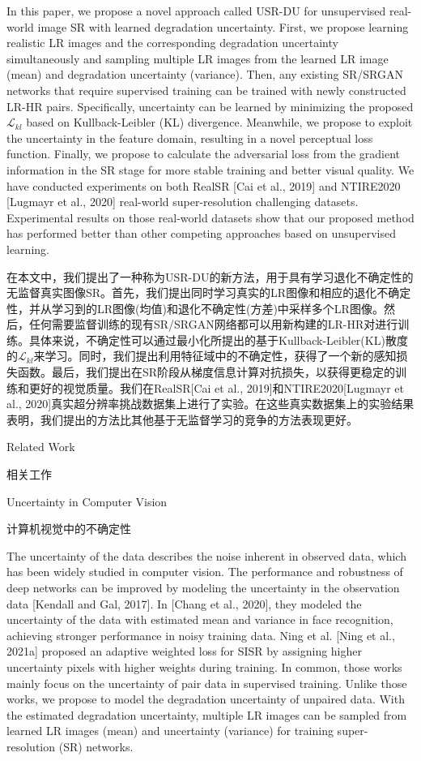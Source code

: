 In this paper, we propose a novel approach called USR-DU for unsupervised real-world image SR with learned degradation uncertainty. First, we propose learning realistic LR images and the corresponding degradation uncertainty simultaneously and sampling multiple LR images from the learned LR image (mean) and degradation uncertainty (variance). Then, any existing SR/SRGAN networks that require supervised training can be trained with newly constructed LR-HR pairs. Specifically, uncertainty can be learned by minimizing the proposed $\mathcal{L}_{kl}$ based on Kullback-Leibler (KL) divergence. Meanwhile, we propose to exploit the uncertainty in the feature domain, resulting in a novel perceptual loss function. Finally, we propose to calculate the adversarial loss from the gradient information in the SR stage for more stable training and better visual quality. We have conducted experiments on both RealSR [Cai et al., 2019] and NTIRE2020 [Lugmayr et al., 2020] real-world super-resolution challenging datasets. Experimental results on those real-world datasets show that our proposed method has performed better than other competing approaches based on unsupervised learning.

在本文中，我们提出了一种称为USR-DU的新方法，用于具有学习退化不确定性的无监督真实图像SR。首先，我们提出同时学习真实的LR图像和相应的退化不确定性，并从学习到的LR图像(均值)和退化不确定性(方差)中采样多个LR图像。然后，任何需要监督训练的现有SR/SRGAN网络都可以用新构建的LR-HR对进行训练。具体来说，不确定性可以通过最小化所提出的基于Kullback-Leibler(KL)散度的$\mathcal{L}_{kl}$来学习。同时，我们提出利用特征域中的不确定性，获得了一个新的感知损失函数。最后，我们提出在SR阶段从梯度信息计算对抗损失，以获得更稳定的训练和更好的视觉质量。我们在RealSR[Cai et al., 2019]和NTIRE2020[Lugmayr et al., 2020]真实超分辨率挑战数据集上进行了实验。在这些真实数据集上的实验结果表明，我们提出的方法比其他基于无监督学习的竞争的方法表现更好。

Related Work

相关工作

Uncertainty in Computer Vision

计算机视觉中的不确定性

The uncertainty of the data describes the noise inherent in observed data, which has been widely studied in computer vision. The performance and robustness of deep networks can be improved by modeling the uncertainty in the observation data [Kendall and Gal, 2017]. In [Chang et al., 2020], they modeled the uncertainty of the data with estimated mean and variance in face recognition, achieving stronger performance in noisy training data. Ning et al. [Ning et al., 2021a] proposed an adaptive weighted loss for SISR by assigning higher uncertainty pixels with higher weights during training. In common, those works mainly focus on the uncertainty of pair data in supervised training. Unlike those works, we propose to model the degradation uncertainty of unpaired data. With the estimated degradation uncertainty, multiple LR images can be sampled from learned LR images (mean) and uncertainty (variance) for training super-resolution (SR) networks.

